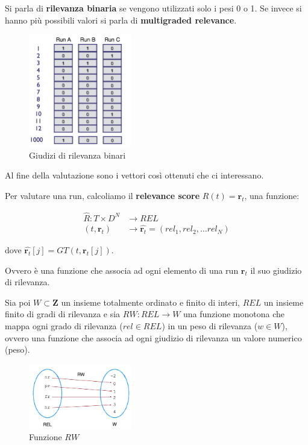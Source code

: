 Si parla di \textbf{rilevanza binaria} se vengono utilizzati solo i pesi 0 o 1.
Se invece si hanno più possibili valori si parla di \textbf{multigraded relevance}.

\begin{figure}[htbp]
	\centering
	\includegraphics[width=0.4\textwidth]{images/l14-fig-7.png}
	\caption{Giudizi di rilevanza binari}
\end{figure}

Al fine della valutazione sono i vettori così ottenuti che ci interessano.

Per valutare una run, calcoliamo il \textbf{relevance score} $R(t) = \mathbf{r}_t$, una funzione:

\begin{align*}
	\hat{R} : T \times D^N &\to REL \\
	(t,\mathbf{r}_t) &\to \hat{\mathbf{r}_t} = (rel_1, rel_2, \ldots rel_N)
\end{align*}

\noindent dove $\hat{\mathbf{r}_t}[j] = GT(t, \mathbf{r}_t[j])$.

Ovvero è una funzione che associa ad ogni elemento di una run $\mathbf{r}_t$ il suo giudizio di rilevanza. 

Sia poi $W \subset \mathbf{Z}$ un insieme totalmente ordinato e finito di interi, $REL$ un insieme finito di gradi di rilevanza e sia $RW: REL \to W$ una funzione monotona che mappa ogni grado di rilevanza ($rel \in REL$) in un peso di rilevanza ($w \in W$), ovvero una funzione che associa ad ogni giudizio di rilevanza un valore numerico (peso).

\begin{figure}[htbp]
	\centering
	\includegraphics[width=0.4\textwidth]{images/l14-fig-8.png}
	\caption{Funzione $RW$}
\end{figure}

